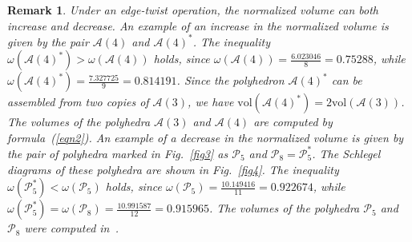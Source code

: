 \documentclass{amsart}
\newtheorem{remark}{Remark}[section]
\newcommand{\vol}{\mathrm{vol}}
\begin{document}
\begin{remark} \label{remark2.1} 
{\rm 
Under an edge-twist operation, the normalized volume can both increase and decrease. An example of an increase in the normalized volume is given by the pair $\mathcal A(4)$ and $\mathcal A(4)^*$. The inequality $\omega(\mathcal A(4)^*) > \omega(\mathcal A(4))$ holds, since $\omega(\mathcal A(4)) = \frac{6.023046}{8} = 0.75288$, while $\omega(\mathcal A(4)^*) = \frac{7.327725}{9} = 0.814191$. Since the polyhedron $\mathcal A(4)^*$ can be assembled from two copies of $\mathcal A(3)$, we have $\vol (\mathcal A(4)^*) = 2 \vol (\mathcal A(3))$. The volumes of the polyhedra $\mathcal A(3)$ and $\mathcal A(4)$ are computed by formula~(\ref{eqn2}). An example of a decrease in the normalized volume is given by the pair of polyhedra marked in Fig.~\ref{fig3} as $\mathcal P_{5}$ and $\mathcal P_8 = \mathcal P^*_5$. The Schlegel diagrams of these polyhedra are shown in Fig.~\ref{fig4}. The inequality $\omega(\mathcal P^*_5) < \omega(\mathcal P_5)$ holds, since $\omega(\mathcal P_5) = \tfrac{10.149416}{11} = 0.922674$, while $\omega(\mathcal P_5^*) = \omega(\mathcal P_8) = \frac{10.991587}{12} = 0.915965$. The volumes of the polyhedra $\mathcal P_5$ and $\mathcal P_8$ were computed in~\cite{VeEg}.
} 
\end{remark}
\end{document}
